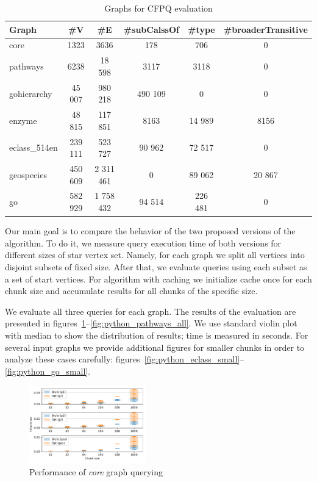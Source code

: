 {\setlength{\tabcolsep}{0.1em}
\begin{table}
{
\caption{Graphs for CFPQ evaluation}
\label{tbl:graphs_for_cfpq}
\small
{}
\begin{tabular}{|l|c|c|c|c|c|}
\hline
Graph          & \#V       & \#E        & \#subCalssOf & \#type &\#broaderTransitive\\
\hline
\hline
core                        & 1323     & 3636       & 178       & 706      & 0      \\
pathways                    & 6238     & 18 598     & 3117      & 3118     & 0      \\
gohierarchy                 & 45 007   & 980 218    & 490 109   & 0        & 0      \\
enzyme                      & 48 815   & 117 851    & 8163      & 14 989   & 8156   \\
eclass\_514en               & 239 111  & 523 727    & 90 962    & 72 517   & 0      \\
geospecies                  & 450 609  & 2 311 461  & 0         & 89 062   & 20 867 \\
go                          & 582 929  & 1 758 432  & 94 514    & 226 481  & 0      \\
\hline
\end{tabular}
}
\end{table}
}


Our main goal is to compare the behavior of the two proposed versions of the algorithm.
To do it, we measure query execution time of both versions for different sizes of star vertex set.
Namely, for each graph we split all vertices into disjoint subsets of fixed size.
After that, we evaluate queries using each subset as a set of start vertices.
For algorithm with caching we initialize cache once for each chunk size and accumulate results for all chunks of the specific size.

We evaluate all three queries for each graph.
The results of the evaluation are presented in figures~\ref{fig:python_core_all}--\ref{fig:python_pathways_all}.
We use standard violin plot with median to show the distribution of results; time is measured in seconds.
For several input graphs we provide additional figures for smaller chunks in order to analyze these cases carefully: figures~\ref{fig:python_eclass_small}--\ref{fig:python_go_small}.

\begin{figure}[h]
\centering
\includegraphics[width=0.45\textwidth]{data/raw/core.pdf}
\caption{Performance of \textit{core} graph querying}
\label{fig:python_core_all}
\end{figure}

